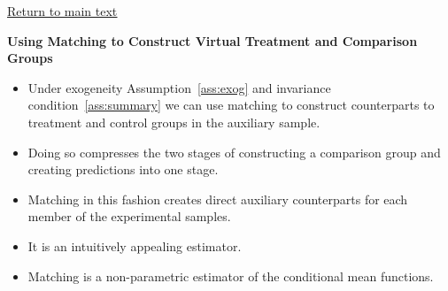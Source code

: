 \documentclass[static]{JJH-Beamer}
\begin{document}
\begin{frame}

\begin{center}
\hyperlink{ret:fruitypebbles}{\underline{Return to main text}}
\end{center}

\end{frame}

\clearpage
{}
\begin{frame}

\hypertarget{potpie}{}
\begin{center}
\textbf{Using Matching to Construct Virtual Treatment and Comparison Groups}
\end{center}

\end{frame}

\begin{frame}

\begin{itemize}
\item Under exogeneity Assumption~\ref{ass:exog} and invariance condition~\ref{ass:summary} we can use matching to construct counterparts to treatment and control groups in the auxiliary sample.
\item Doing so compresses the two stages of constructing a comparison group and creating predictions into one stage.
\item Matching in this fashion creates direct auxiliary counterparts for each member of the experimental samples.
\item It is an intuitively appealing estimator.
\item Matching is a non-parametric estimator of the conditional mean functions.
\end{itemize}

\end{frame}
\end{document}
